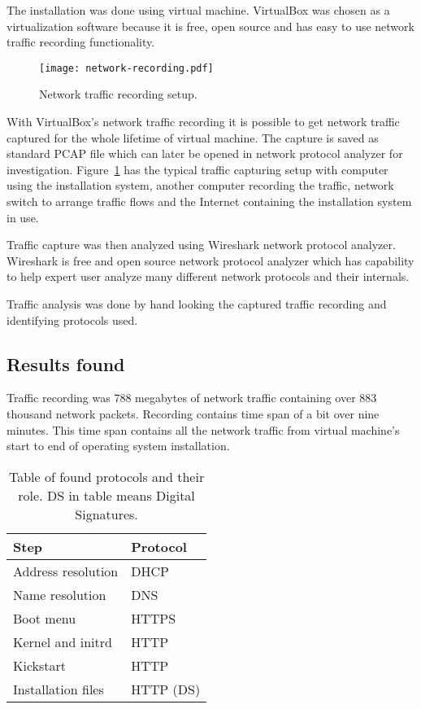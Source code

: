 The installation was done using virtual machine. VirtualBox was chosen
as a virtualization software because it is free, open source and has
easy to use network traffic recording functionality.

\begin{figure}[h]
  \caption{Network traffic recording setup.\label{fig:network-recording}}
  \texttt{[image: network-recording.pdf]}
\end{figure}

With VirtualBox's network traffic recording it is possible to get
network traffic captured for the whole lifetime of virtual
machine. The capture is saved as standard PCAP file which can later be
opened in network protocol analyzer for
investigation. Figure~\ref{fig:network-recording} has the typical
traffic capturing setup with computer using the installation
system, another computer recording the traffic, network switch
to arrange traffic flows and the Internet containing the installation
system in use.

Traffic capture was then analyzed using Wireshark network protocol
analyzer. Wireshark is free and open source network protocol analyzer
which has capability to help expert user analyze many different
network protocols and their internals.

Traffic analysis was done by hand looking the captured traffic
recording and identifying protocols used.

\subsection{Results found}

Traffic recording was 788 megabytes of network traffic containing over
883 thousand network packets. Recording contains time span of a bit
over nine minutes. This time span contains all the network traffic
from virtual machine's start to end of operating system installation.

\begin{table}[!ht]
  \def\arraystretch{1.1}%
  \begin{center}
    \caption{Table of found protocols and their role. DS in table
      means Digital Signatures.\label{tab:found_protocols_table}}
    \begin{tabular}{| l | l |}
      \hline
      Step               & Protocol    \\
      \hline
      Address resolution & DHCP        \\
      Name resolution    & DNS         \\
      Boot menu          & HTTPS       \\
      Kernel and initrd  & HTTP        \\
      Kickstart          & HTTP        \\
      Installation files & HTTP (DS)   \\
      \hline
    \end{tabular}
  \end{center}
\end{table}

